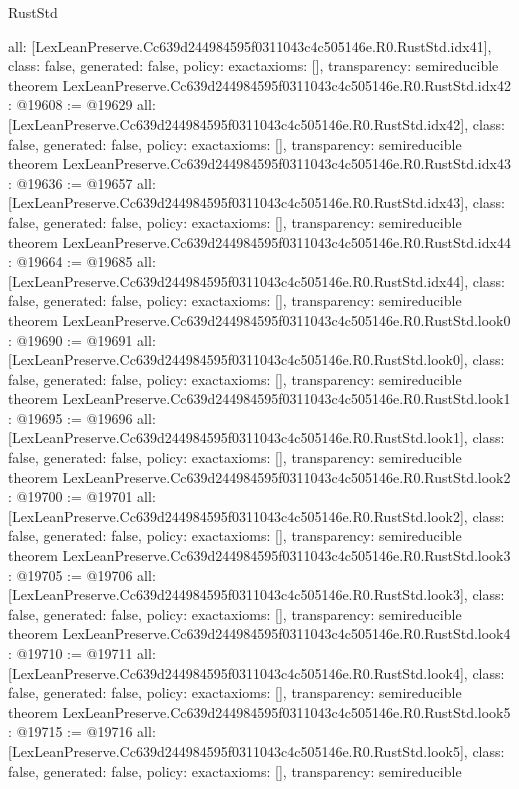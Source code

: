 \begin{lexlean}{RustStd}
\begin{coremodule}
{  all: [LexLeanPreserve.Cc639d244984595f0311043c4c505146e.R0.RustStd.idx41],
  class: false,
  generated: false,
  policy: exact{axioms: []},
  transparency: semireducible
}
theorem LexLeanPreserve.Cc639d244984595f0311043c4c505146e.R0.RustStd.idx42 : @19608 := @19629 {
  all: [LexLeanPreserve.Cc639d244984595f0311043c4c505146e.R0.RustStd.idx42],
  class: false,
  generated: false,
  policy: exact{axioms: []},
  transparency: semireducible
}
theorem LexLeanPreserve.Cc639d244984595f0311043c4c505146e.R0.RustStd.idx43 : @19636 := @19657 {
  all: [LexLeanPreserve.Cc639d244984595f0311043c4c505146e.R0.RustStd.idx43],
  class: false,
  generated: false,
  policy: exact{axioms: []},
  transparency: semireducible
}
theorem LexLeanPreserve.Cc639d244984595f0311043c4c505146e.R0.RustStd.idx44 : @19664 := @19685 {
  all: [LexLeanPreserve.Cc639d244984595f0311043c4c505146e.R0.RustStd.idx44],
  class: false,
  generated: false,
  policy: exact{axioms: []},
  transparency: semireducible
}
theorem LexLeanPreserve.Cc639d244984595f0311043c4c505146e.R0.RustStd.look0 : @19690 := @19691 {
  all: [LexLeanPreserve.Cc639d244984595f0311043c4c505146e.R0.RustStd.look0],
  class: false,
  generated: false,
  policy: exact{axioms: []},
  transparency: semireducible
}
theorem LexLeanPreserve.Cc639d244984595f0311043c4c505146e.R0.RustStd.look1 : @19695 := @19696 {
  all: [LexLeanPreserve.Cc639d244984595f0311043c4c505146e.R0.RustStd.look1],
  class: false,
  generated: false,
  policy: exact{axioms: []},
  transparency: semireducible
}
theorem LexLeanPreserve.Cc639d244984595f0311043c4c505146e.R0.RustStd.look2 : @19700 := @19701 {
  all: [LexLeanPreserve.Cc639d244984595f0311043c4c505146e.R0.RustStd.look2],
  class: false,
  generated: false,
  policy: exact{axioms: []},
  transparency: semireducible
}
theorem LexLeanPreserve.Cc639d244984595f0311043c4c505146e.R0.RustStd.look3 : @19705 := @19706 {
  all: [LexLeanPreserve.Cc639d244984595f0311043c4c505146e.R0.RustStd.look3],
  class: false,
  generated: false,
  policy: exact{axioms: []},
  transparency: semireducible
}
theorem LexLeanPreserve.Cc639d244984595f0311043c4c505146e.R0.RustStd.look4 : @19710 := @19711 {
  all: [LexLeanPreserve.Cc639d244984595f0311043c4c505146e.R0.RustStd.look4],
  class: false,
  generated: false,
  policy: exact{axioms: []},
  transparency: semireducible
}
theorem LexLeanPreserve.Cc639d244984595f0311043c4c505146e.R0.RustStd.look5 : @19715 := @19716 {
  all: [LexLeanPreserve.Cc639d244984595f0311043c4c505146e.R0.RustStd.look5],
  class: false,
  generated: false,
  policy: exact{axioms: []},
  transparency: semireducible
}
\end{coremodule}
\end{lexlean}
